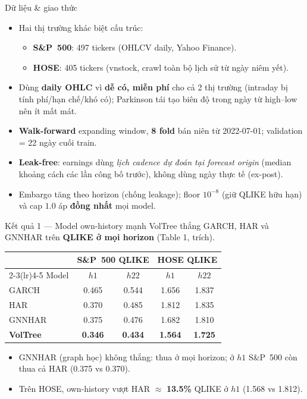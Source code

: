 \documentclass[aspectratio=169]{beamer}
\begin{document}
\begin{frame}{Dữ liệu \& giao thức}
  \begin{itemize}
    \item Hai thị trường khác biệt cấu trúc:
      \begin{itemize}
        \item \textbf{S\&P~500}: 497 tickers (OHLCV daily, Yahoo Finance).
        \item \textbf{HOSE}: 405 tickers (vnstock, crawl toàn bộ lịch sử từ ngày niêm yết).
      \end{itemize}
    \item Dùng \textbf{daily OHLC} vì \textbf{dễ có, miễn phí} cho cả 2 thị trường (intraday bị tính phí/hạn chế/khó có); Parkinson tái tạo biên độ trong ngày từ high--low nên ít mất mát.
    \item \textbf{Walk-forward} expanding window, \textbf{8 fold} bán niên từ 2022-07-01; validation = 22 ngày cuối train.
    \item \textbf{Leak-free}: earnings dùng \emph{lịch cadence dự đoán tại forecast origin} (median khoảng cách các lần công bố trước), không dùng ngày thực tế (ex-post).
    \item Embargo tăng theo horizon (chống leakage); floor $10^{-8}$ (giữ QLIKE hữu hạn) và cap $1.0$ áp \textbf{đồng nhất} mọi model.
  \end{itemize}
\end{frame}

\begin{frame}{Kết quả 1 --- Model own-history mạnh}
  VolTree thắng GARCH, HAR và GNNHAR trên \textbf{QLIKE ở mọi horizon} (Table 1, trích).
  \begin{center}
  \footnotesize
  \begin{tabular}{l cc cc}
    \toprule
     & \multicolumn{2}{c}{\textbf{S\&P~500 QLIKE}} & \multicolumn{2}{c}{\textbf{HOSE QLIKE}} \\
    \cmidrule(lr){2-3}\cmidrule(lr){4-5}
    Model & $h1$ & $h22$ & $h1$ & $h22$ \\
    \midrule
    GARCH   & 0.465 & 0.544 & 1.656 & 1.837 \\
    HAR     & 0.370 & 0.485 & 1.812 & 1.835 \\
    GNNHAR  & 0.375 & 0.476 & 1.682 & 1.810 \\
    \textbf{VolTree} & \textbf{0.346} & \textbf{0.434} & \textbf{1.564} & \textbf{1.725} \\
    \bottomrule
  \end{tabular}
  \end{center}
  \begin{itemize}
    \item GNNHAR (graph học) không thắng: thua ở mọi horizon; ở $h1$ S\&P~500 còn thua cả HAR (0.375 vs 0.370).
    \item Trên HOSE, own-history vượt HAR $\approx$ \textbf{13.5\%} QLIKE ở $h1$ (1.568 vs 1.812).
  \end{itemize}
\end{frame}
\end{document}
